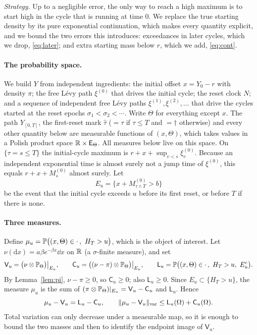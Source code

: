 \documentclass[11pt,a4paper]{article}
\begin{document}
\emph{Strategy.} Up to a negligible error, the only way to reach a high maximum is to start high in the cycle that is running at time $0$. We replace the true starting density by its pure exponential continuation, which makes every quantity explicit, and we bound the two errors this introduces: exceedances in later cycles, which we drop, \eqref{eq:later}; and extra starting mass below $r$, which we add, \eqref{eq:cont}.

\paragraph{The probability space.}
We build $Y$ from independent ingredients: the initial offset $x=Y_0-r$ with density $\pi$; the free L\'evy path $\xi^{(0)}$ that drives the initial cycle; the reset clock $N$; and a sequence of independent free L\'evy paths $\xi^{(1)},\xi^{(2)},\dots$ that drive the cycles started at the reset epochs $\sigma_1<\sigma_2<\cdots$. Write $\Theta$ for everything except $x$. The path $Y_{[0,T]}$, the first-reset mark $\widehat\tau$ ($=\tau$ if $\tau\le T$ and $=\dagger$ otherwise) and every other quantity below are measurable functions of $(x,\Theta)$, which takes values in a Polish product space $\mathbb R\times\mathsf E_\Theta$. All measures below live on this space. On $\{\tau=s\le T\}$ the initial-cycle maximum is $r+x+\sup_{v<s}\xi^{(0)}_v$. Because an independent exponential time is almost surely not a jump time of $\xi^{(0)}$, this equals $r+x+M^{(0)}_s$ almost surely. Let
\[
 E_u=\big\{x+M^{(0)}_{\tau\wedge T}>b\big\}
\]
be the event that the initial cycle exceeds $u$ before its first reset, or before $T$ if there is none.

\paragraph{Three measures.}
Define $\mu_u=\PP\big((x,\Theta)\in\cdot\,,\ H_T>u\big)$, which is the object of interest. Let $\nu(\mathrm dx)=a\beta e^{-\beta x}\dd x$ on $\mathbb R$ (a $\sigma$-finite measure), and set
\[
 \mathsf V_u=\big(\nu\otimes\PP_\Theta\big)\big|_{E_u},\qquad
 \mathsf C_u=\big((\nu-\pi)\otimes\PP_\Theta\big)\big|_{E_u},\qquad
 \mathsf L_u=\PP\big((x,\Theta)\in\cdot\,,\ H_T>u,\ E_u^c\big).
\]
By Lemma~\ref{lem:pi}, $\nu-\pi\ge0$, so $\mathsf C_u\ge0$; also $\mathsf L_u\ge0$. Since $E_u\subset\{H_T>u\}$, the measure $\mu_u$ is the sum of $(\pi\otimes\mathbb P_\Theta)|_{E_u}=\mathsf V_u-\mathsf C_u$ and $\mathsf L_u$. Hence
\begin{equation}\label{eq:pathlevel}
 \mu_u-\mathsf V_u=\mathsf L_u-\mathsf C_u,\qquad \|\mu_u-\mathsf V_u\|_{\mathrm{var}}\le\mathsf L_u(\Omega)+\mathsf C_u(\Omega).
\end{equation}
Total variation can only decrease under a measurable map, so it is enough to bound the two masses and then to identify the endpoint image of $\mathsf V_u$.
\end{document}
